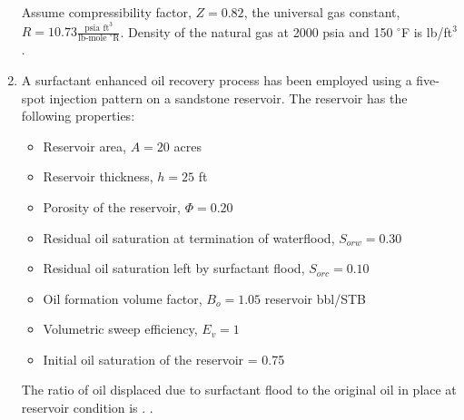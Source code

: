 \documentclass[journal,12pt,onecolumn]{IEEEtran}
\theoremstyle{remark}
\begin{document}
\begin{enumerate}
Assume compressibility factor, $Z = 0.82$, the universal gas constant, $R = 10.73 \frac{\text{psia ft}^3}{\text{lb-mole }^\circ\text{R}}$. Density of the natural gas at 2000 psia and 150 $^\circ$F is \underline{\hspace{1cm}} lb/ft$^3$ .
\begin{enumerate}
\end{enumerate}
\hfill{}



 \item A surfactant enhanced oil recovery process has been employed using a five-spot injection pattern on a sandstone reservoir. The reservoir has the following properties:

\begin{itemize}
\item Reservoir area, $A = 20$ acres
\item Reservoir thickness, $h = 25$ ft
\item Porosity of the reservoir, $\Phi = 0.20$
\item Residual oil saturation at termination of waterflood, $S_{orw} = 0.30$
\item Residual oil saturation left by surfactant flood, $S_{orc} = 0.10$
\item Oil formation volume factor, $B_o = 1.05$ reservoir bbl/STB
\item Volumetric sweep efficiency, $E_v = 1$
\item Initial oil saturation of the reservoir = 0.75
\end{itemize}

The ratio of oil displaced due to surfactant flood to the original oil in place at reservoir condition is \underline{\hspace{1cm}} .
.
\begin{enumerate}
\end{enumerate}
\hfill{}




\end{enumerate}
\end{document}
